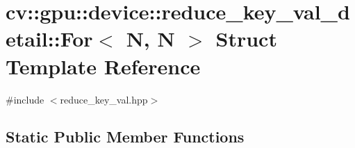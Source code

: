 \hypertarget{structcv_1_1gpu_1_1device_1_1reduce__key__val__detail_1_1For_3_01N_00_01N_01_4}{\section{cv\-:\-:gpu\-:\-:device\-:\-:reduce\-\_\-key\-\_\-val\-\_\-detail\-:\-:For$<$ N, N $>$ Struct Template Reference}
\label{structcv_1_1gpu_1_1device_1_1reduce__key__val__detail_1_1For_3_01N_00_01N_01_4}
}


{\ttfamily \#include $<$reduce\-\_\-key\-\_\-val.\-hpp$>$}

\subsection*{Static Public Member Functions}
